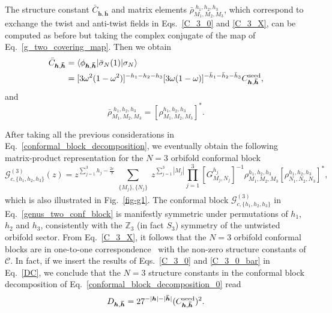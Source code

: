 \documentclass[a4paper,11pt]{article}
\begin{document}
The structure constant $\bar{C}_{\boldsymbol{h}, \boldsymbol{\bar{h}}}$ 
and matrix elements $\bar{\rho}_{M_1, M_2, M_3}^{\;h_1, h_2, h_3}$, which 
correspond to exchange the twist and anti-twist fields in Eqs.~\eqref{C_3_0} 
and \eqref{C_3_X}, can be computed as before but taking the complex conjugate 
of the map of Eq.~\eqref{g_two_covering_map}. Then we obtain 
\begin{align}\label{C_3_0_bar}
 \bar{C}_{\boldsymbol{h}, \boldsymbol{\bar{h}}}&=
 \langle \phi_{\boldsymbol{h}, \boldsymbol{\bar{h}}}|\bar{\sigma}_N(1)|\sigma_N\rangle  \nonumber \\
 &=[3\omega^2(1-\omega^2)]^{-h_1-h_2-h_3}[3\omega(1-\omega)]^{-\bar{h}_1-\bar{h}_2-\bar{h}_3}C_{\boldsymbol{h}, \boldsymbol{\bar{h}}}^{{\rm seed}},
\end{align}
and 
\begin{equation}
\bar{\rho}_{M_1, M_2, M_3}^{\; h_1, h_2, h_3}=[\rho_{M_1, M_2, M_3}^{h_1, h_2, h_3}]^*.
\end{equation}

After taking all the previous considerations in Eq.~\eqref{conformal_block_decomposition},
we eventually obtain the following matrix-product representation for the $N=3$ orbifold 
conformal block \cite{Collier}
\begin{equation}\label{genus_two_conf_block}
 \mathcal{G}_{c, \{h_1, h_2, h_3\}}^{(3)}(z)=
z^{\sum_{j=1}^3 h_j-\frac{2c}{9}}\sum_{\substack{\{M_j\}, \{N_j\}}}
 z^{\sum\limits_{j=1}^3 |M_j|}
 \prod_{j=1}^3 [G_{M_j,N_j}^{h_j}]^{-1}
 \rho^{h_1,h_2,h_3}_{M_1,M_2,M_3}[\rho_{N_1,N_2,N_3}^{h_1,h_2,h_3}]^*,
\end{equation}
which is also illustrated in Fig.~\ref{fig-g1}.
The conformal block $\mathcal{G}_{c, \{h_1, h_2, h_3\}}^{(3)}$ in Eq.~\eqref{genus_two_conf_block} is
manifestly symmetric under permutations of $h_1$, $h_2$ and $h_3$, consistently with the $\mathbb Z_3$ 
(in fact $S_3$) symmetry of the untwisted orbifold sector. From Eq.~\eqref{C_3_X}, it follows that the 
$N=3$ orbifold conformal blocks are in one-to-one correspondence~\cite{Cardy, Collier} with the non-zero 
structure constants of $\mathcal{C}$. In fact, if we insert the results of Eqs.~\eqref{C_3_0} and \eqref{C_3_0_bar} 
in Eq.~\eqref{DC}, we conclude that the $N=3$ structure constants in the conformal block decomposition of Eq.~\eqref{conformal_block_decomposition_0} read
\begin{equation}\label{D_3}
 D_{\boldsymbol{h}, \boldsymbol{\bar{h}}}=
 27^{-|\boldsymbol{h}|-|\boldsymbol{\bar{h}}|}
 (C_{\boldsymbol{h}, \boldsymbol{\bar{h}}}^{{\rm seed}})^2.
\end{equation}
\end{document}
